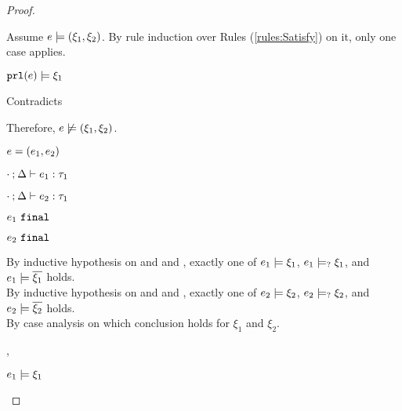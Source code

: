 \begin{proof}
\begin{byCases}
\begin{byCases}
\begin{byCases}
            Assume $e \models (\xi_1 , \xi_2)$. By rule induction over Rules (\ref{rules:Satisfy}) on it, only one case applies.
            \begin{byCases}
            \item[\text{(\ref{rule:CSNotValPair})}]
                \begin{pfsteps*}
                \item $\mathtt{prl}(e) \models \xi_1$ 
                \end{pfsteps*}
                Contradicts 
            \end{byCases}
            Therefore, $e \not\models (\xi_1 , \xi_2)$.
        \end{byCases}
    \item[\text{(\ref{rule:TPair})}]
        \begin{pfsteps*}
        \item $e=(e_1 , e_2)$ 
        \item $\cdot \mathbin{;} \Delta \vdash e_1 : \tau_1$  
        \item $\cdot \mathbin{;} \Delta \vdash e_2 : \tau_1$  
        \item $e_1 ~\mathtt{final}$  
        \item $e_2 ~\mathtt{final}$  
        \end{pfsteps*}
        By inductive hypothesis on  and  and , exactly one of $e_1 \models \xi_1$, $e_1 \models_{?} \xi_1$, and $e_1 \models \overline{\xi_1}$ holds. \\
        By inductive hypothesis on  and  and , exactly one of $e_2 \models \xi_2$, $e_2 \models_{?} \xi_2$, and $e_2 \models \overline{\xi_2}$ holds. \\
        By case analysis on which conclusion holds for $\xi_1$ and $\xi_2$.
        \begin{byCases}
        \item[\csatisfy{e_1}{\xi_1},\csatisfy{e_2}{\xi_2}]
            \begin{pfsteps*}
            \item $e_1 \models \xi_1$  

\end{pfsteps*}
\end{byCases}
\end{byCases}
\end{byCases}
\end{proof}
